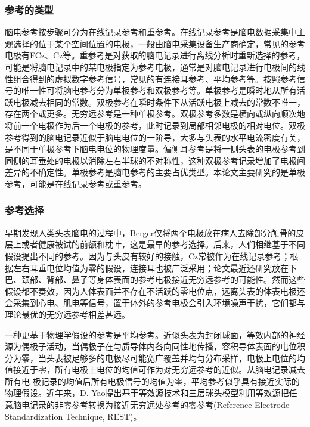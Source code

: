 \subsubsection{参考的类型}
脑电参考按步骤可分为在线记录参考和重参考。在线记录参考是脑电数据采集中主观选择的位于某个空间位置的电极，一般由脑电采集设备生产商确定，常见的参考电极有FCz、Cz等。重参考是对获取的脑电记录进行离线分析时重新选择的参考，可能是将脑电记录中的某电极指定为参考电极，通常是对脑电记录进行电极间的线性组合得到的虚拟数字参考信号，常见的有连接耳参考、平均参考等。按照参考信号的唯一性可将脑电参考分为单极参考和双极参考等。单极参考是瞬时地从所有活跃电极减去相同的常数。双极参考在瞬时条件下从活跃电极上减去的常数不唯一，存在两个或更多。无穷远参考是一种单极参考。双极参考多数是横向或纵向顺次地将前一个电极作为后一个电极的参考，此时记录到局部相邻电极的相对电位。双极参考得到的脑电记录近似于脑电电位的一阶导，大多与头表的水平电流密度有关，是不同于单极参考下脑电电位的物理度量。偏侧耳参考是将一侧头表的电极参考到同侧的耳垂处的电极以消除左右半球的不对称性，这种双极参考记录增加了电极间差异的不确定性。单极参考是脑电参考的主要占优类型。本论文主要研究的是单极参考，可能是在线记录参考或重参考。

\subsubsection{参考选择}
早期发现人类头表脑电的过程中，Berger仅将两个电极放在病人去除部分颅骨的皮层上或者健康被试的前额和枕叶，这是最早的参考选择。后来，人们相继基于不同假设提出不同的参考。因为与头皮有较好的接触，Cz常被作为在线记录参考；根据左右耳垂电位均值为零的假设，连接耳也被广泛采用；论文最近还研究放在下巴、颈部、背部、鼻子等身体表面的参考电极接近无穷远参考的可能性。然而这些假设都不奏效，因为人体表面并不存在不活跃的零电位点，远离头表的体表电极还会采集到心电、肌电等信号，置于体外的参考电极会引入环境噪声干扰，它们都与理论最优的无穷远参考相差甚远。

一种更基于物理学假设的参考是平均参考。近似头表为封闭球面，等效内部的神经源为偶极子活动，当偶极子在匀质导体内各向同性地传播，容积导体表面的电位积分为零，当头表被足够多的电极尽可能宽广覆盖并均匀分布采样，电极上电位的均值接近于零，所有电极上电位的均值可作为对无穷远参考的近似。从脑电记录减去所有电
极记录的均值后所有电极信号的均值为零，平均参考似乎具有接近实际的物理假设。近年来，D. Yao提出基于等效源技术和三层球头模型利用等效源把任意脑电记录的非零参考转换为接近无穷远处参考的零参考(Reference Electrode Standardization Technique, REST)。

